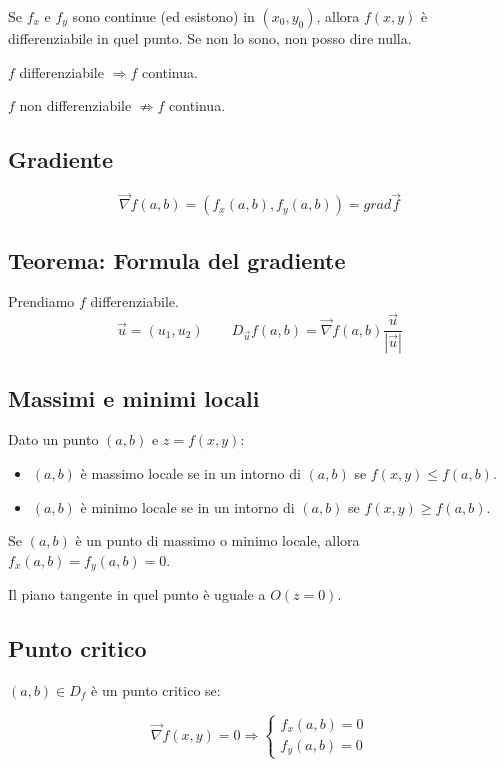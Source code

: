\documentclass[10pt,a4paper,fleqn]{article}
\begin{document}
	Se $f_x$ e $f_y$ sono continue (ed esistono) in $(x_0, y_0)$, allora $f(x,y)$ è differenziabile in quel punto. Se non lo sono, non posso dire nulla.
	
	$f$ differenziabile $\Rightarrow f$ continua.
	
	$f$ non differenziabile $\not\Rightarrow f$ continua.
	
	\subsection{Gradiente}

	\begin{equation}
	\vec{\nabla}f(a, b) = (f_x(a, b), f_y(a, b)) = grad \vec{f}
	\end{equation}

	\subsection{Teorema: Formula del gradiente}

	Prendiamo $f$ differenziabile.
	\begin{equation}
	\vec{u}=(u_1, u_2) \qquad D_{\vec{u}} f(a, b) = \vec{\nabla} f(a, b) \frac{\vec{u}}{|\vec{u}|}
	\end{equation}

	\subsection{Massimi e minimi locali}

	Dato un punto $(a, b)$ e $z = f(x, y)$:
	\begin{itemize}
		\item $(a, b)$ è massimo locale se in un intorno di $(a, b)$ se $f(x, y) \leq f(a, b)$.
		\item$(a, b)$ è minimo locale se in un intorno di $(a, b)$ se $f(x, y) \geq f(a, b)$.
	\end{itemize}
	
	Se $(a, b)$ è un punto di massimo o minimo locale, allora $f_x(a, b) = f_y(a, b) = 0$.
	
	Il piano tangente in quel punto è uguale a $O(z=0)$.

	\subsection{Punto critico}

	$(a, b) \in D_f$ è un punto critico se:
	
	\begin{equation}
		\vec \nabla f(x,y) = 0 \Rightarrow
		\begin{cases}
			f_x(a, b) = 0 \\
			f_y(a, b) = 0
		\end{cases}
	\end{equation}
\end{document}
